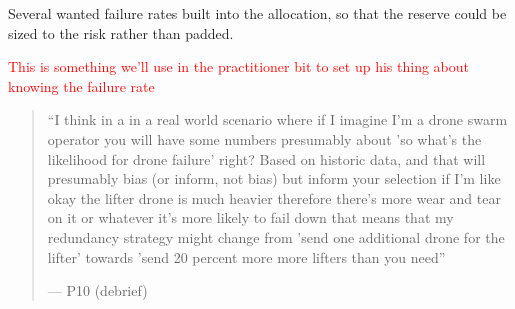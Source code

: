 \label{sec:qual:failure:blind}
Several wanted failure rates built into the allocation, so that the reserve could be sized to the risk rather than padded.

\textcolor{red}{This is something we'll use in the practitioner bit to set up his thing about knowing the failure rate}
\begin{quote}\small
``I think in a in a real world scenario where if I imagine I'm a drone swarm operator you will have some numbers presumably about 'so what's the likelihood for drone failure' right? Based on historic data, and that will presumably bias (or inform, not bias) but inform your selection if I'm like okay the lifter drone is much heavier therefore there's more wear and tear on it or whatever it's more likely to fail down that means that my redundancy strategy might change from 'send one additional drone for the lifter' towards 'send 20 percent more more lifters than you need''\par\hfill--- P10 (debrief)
\end{quote}


\clearpage
